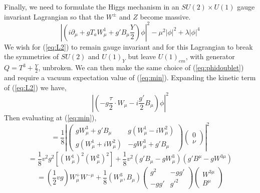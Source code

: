 Finally, we need to formulate the Higgs mechanism in an $SU(2)\times U(1)$ 
gauge invariant Lagrangian so that the $W^{\pm}$ and $Z$ become massive. 
\begin{equation} %
\left| \left( i\partial_{\mu}+gT_{a}W_{\mu}^{1}+g'B_{\mu}\frac{Y}{2}\right)\phi \right|^{2} - \mu^{2}\left| \phi \right| ^{2}
+\lambda\left| \phi \right| ^{4}
\label{eq:L2}
\end{equation}
We wish for (\ref{eq:L2}) to remain gauge invariant and 
for this Lagrangian to break the symmetries of $SU(2)$ and $U(1)_{Y}$
but leave $U(1)_{em}$, with generator $Q=T^{3}+\frac{Y}{2}$, unbroken. 
We can then make the same choice of (\ref{eq:phidoublet}) and require a vacuum 
expectation value of (\ref{eq:min}).
Expanding the kinetic term of (\ref{eq:L2}) we have,
\begin{equation}
\left| \left(-g\frac{\tau}{2}\cdot W_{\mu}-i\frac{g'}{2}B_{\mu}\right)\phi\right|^{2}
\end{equation}
Then evaluating at (\ref{eq:min}),
\begin{equation}
=\frac{1}{8}\left|
\begin{pmatrix}
		gW_{\mu}^{3}+g'B_{\mu} & g(W_{\mu}^{1}-iW_{\mu}^{2})\\
		g(W_{\mu}^{1}+iW_{\mu}^{2}) & -gW_{\mu}^{3}+g'B_{\mu}
\end{pmatrix}
\begin{pmatrix}
0\\
\nu
\end{pmatrix}
\right|^{2}
\end{equation}
\begin{equation}
=
\frac{1}{8}v^{2}g^{2}\left[\left(W_{\mu}^{1} \right)^{2} \left(W_{\mu}^{2} \right)^{2} \right]
+\frac{1}{8}v^{2}(g'B_{\mu}-gW_{\mu}^{3})(g'B^{\mu}-gW^{3\mu}) 
\end{equation}
\begin{equation}
=(\frac{1}{2}v g)W_{\mu}^{+}W^{-\mu}+\frac{1}{8}(W_{\mu}^{3},B_{\mu})
\begin{pmatrix}
g^{2} & -gg'\\
-gg'  & g'^{2}
\end{pmatrix}
\begin{pmatrix}
W^{3\mu}\\
B^{\mu}
\end{pmatrix}
\label{eq:finalH}
\end{equation}
